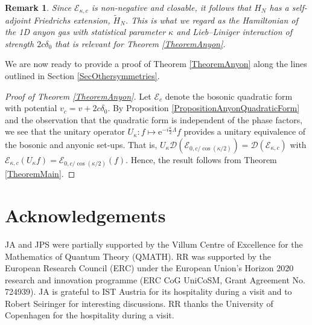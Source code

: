 \documentclass[a4paper,11pt]{article}
\newcommand{\euler}[1]{\text{e}^{#1}}
\newcommand{\dom}[1]{\mathcal D\left(#1\right)}
\newtheorem{remark}[theorem]{Remark}
\numberwithin{equation}{section}
\begin{document}
			\begin{remark}\label{RemarkAnyons}
				Since $ \mathcal{E}_{\kappa,c}$ is non-negative and closable, it follows that $ H_N $ has a self-adjoint Friedrichs extension, $ \tilde{H}_N $. This is what we regard as the Hamiltonian of the 1D anyon gas with statistical parameter $ \kappa $ and Lieb--Liniger interaction of strength $2c\delta_0 $ that is relevant for Theorem \ref{TheoremAnyon}.
			\end{remark}

				We are now ready to provide a proof of Theorem \ref{TheoremAnyon} along the lines outlined in Section \ref{SecOthersymmetries}.

			\begin{proof}[Proof of Theorem \ref{TheoremAnyon}]
				Let $ \mathcal{E}_c $ denote the bosonic quadratic form with potential $ v_c=v+2c\delta_0 $. By Proposition \ref{PropositionAnyonQuadraticForm} and the observation that the quadratic form is independent of the phase factors, we see that the unitary operator $ U_\kappa: f\mapsto \euler{-i\frac{\kappa}{2}\Lambda}f $ provides a unitary equivalence of the bosonic and anyonic set-ups. That is, $ U_\kappa\dom{\mathcal{E}_{0,c/\cos(\kappa/2)}}=\dom{\mathcal{E}_{\kappa,c}} $ with $ \mathcal{E}_{\kappa,c}(U_\kappa f)=\mathcal{E}_{0,c/\cos(\kappa/2)}(f) $. Hence, the result follows from Theorem \ref{TheoremMain}.
			\end{proof}
			\section{Acknowledgements}
			JA and JPS were partially supported by the Villum Centre of Excellence for the Mathematics of Quantum Theory (QMATH). RR was supported by the European Research Council (ERC) under the European Union’s Horizon 2020 research and innovation programme (ERC CoG UniCoSM, Grant Agreement No. 724939). JA is grateful to IST Austria for its hospitality during a visit  and to Robert Seiringer for interesting discussions. RR thanks the University of Copenhagen for the hospitality during a visit.
	
	
	
\end{document}
